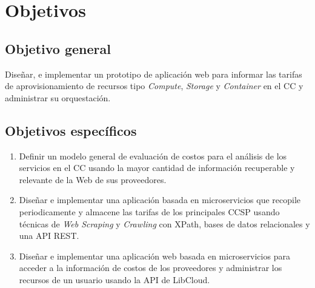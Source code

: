 \chapter{Objetivos} %

\label{ch:objetivos} %




\section{Objetivo general}
Diseñar, e implementar un prototipo de aplicación web para informar las tarifas de aprovisionamiento de recursos tipo \emph{Compute}, \emph{Storage} y \emph{Container} en el \acrshort{CC} y administrar su orquestación.\bigskip

\section{Objetivos específicos}
\begin{enumerate}
    \item Definir un modelo general de evaluación de costos para el análisis de los servicios en el \acrshort{CC} usando la mayor cantidad de información recuperable y relevante de la Web de sus proveedores.
    
    \item Diseñar e implementar una aplicación basada en microservicios que recopile periodicamente y almacene las tarifas de los principales \acrshort{CCSP} usando técnicas de \emph{Web Scraping} y \emph{Crawling} con \gls{XPath}, bases de datos relacionales y una \acrshort{API REST}.
    
    \item Diseñar e implementar una aplicación web basada en microservicios para acceder a la información de costos de los proveedores y administrar los recursos de un usuario usando la \acrshort{API} de \gls{LibCloud}.
    
\end{enumerate}